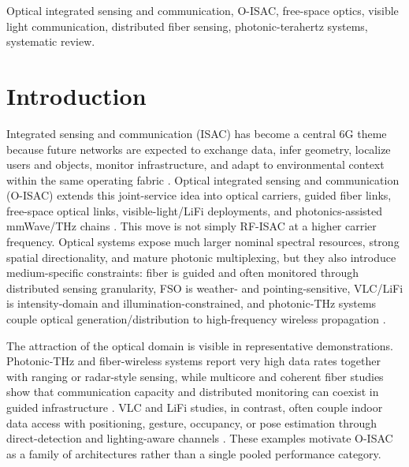 \documentclass[letterpaper,journal]{IEEEtran}
\begin{document}
\begin{IEEEkeywords}
    Optical integrated sensing and communication, O-ISAC, free-space optics, visible light communication, distributed fiber sensing, photonic-terahertz systems, systematic review.
\end{IEEEkeywords}



\section{Introduction}
\label{introduction}

Integrated sensing and communication (ISAC) has become a central 6G theme because future networks are expected to exchange data, infer geometry, localize users and objects, monitor infrastructure, and adapt to environmental context within the same operating fabric \cite{O_ISAC_070,O_ISAC_162}. Optical integrated sensing and communication (O-ISAC) extends this joint-service idea into optical carriers, guided fiber links, free-space optical links, visible-light/LiFi deployments, and photonics-assisted mmWave/THz chains \cite{O_ISAC_021,O_ISAC_068,O_ISAC_303}. This move is not simply RF-ISAC at a higher carrier frequency. Optical systems expose much larger nominal spectral resources, strong spatial directionality, and mature photonic multiplexing, but they also introduce medium-specific constraints: fiber is guided and often monitored through distributed sensing granularity, FSO is weather- and pointing-sensitive, VLC/LiFi is intensity-domain and illumination-constrained, and photonic-THz systems couple optical generation/distribution to high-frequency wireless propagation \cite{O_ISAC_006,O_ISAC_023,O_ISAC_039,O_ISAC_070}.

The attraction of the optical domain is visible in representative demonstrations. Photonic-THz and fiber-wireless systems report very high data rates together with ranging or radar-style sensing, while multicore and coherent fiber studies show that communication capacity and distributed monitoring can coexist in guided infrastructure \cite{O_ISAC_016,O_ISAC_029,O_ISAC_043,O_ISAC_044,O_ISAC_046,O_ISAC_105}. VLC and LiFi studies, in contrast, often couple indoor data access with positioning, gesture, occupancy, or pose estimation through direct-detection and lighting-aware channels \cite{O_ISAC_009,O_ISAC_022,O_ISAC_039,O_ISAC_050,O_ISAC_062}. These examples motivate O-ISAC as a family of architectures rather than a single pooled performance category.
\end{document}
